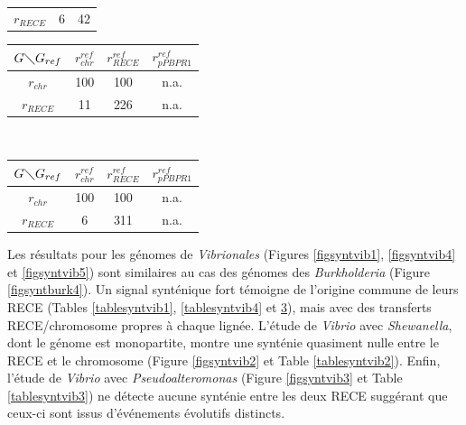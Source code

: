 \begin{table}[H]
\begin{center}
\begin{minipage}[t]{0.3\textwidth}
\begin{tabular}{c|cc}
   		$ r_{RECE}$ & 6 & 42\\
   	\end{tabular}
   \end{minipage}
   \begin{minipage}[t]{0.3\textwidth}
   \label{tablesyntvib4}
   	\begin{tabular}{c|ccc}
   		$G \diagdown G_{ref}$ & $r^{ref}_{chr}$ & $r^{ref}_{RECE}$ & $r^{ref}_{pPBPR1}$\\
   		\hline
    		$r_{chr}$ & 100 & 100 & n.a.\\
   		$r_{RECE}$ & 11 & 226 & n.a.\\
   		\end{tabular}
   \end{minipage}
   \\
 	\begin{minipage}[t]{0.4\textwidth}
   \label{tablesyntvib5}
   	\begin{tabular}{c|ccc}
   		$G \diagdown G_{ref}$ & $r^{ref}_{chr}$ & $r^{ref}_{RECE}$ & $r^{ref}_{pPBPR1}$\\
   		\hline
    		$r_{chr}$ & 100 & 100 & n.a.\\
   		$r_{RECE}$ & 6 & 311 & n.a.\\
   	\end{tabular}
	\end{minipage}  
   \end{center}
\end{table}     

  Les résultats pour les génomes de \textit{Vibrionales} (Figures \ref{figsyntvib1}, \ref{figsyntvib4} et \ref{figsyntvib5}) sont similaires au cas des génomes des \textit{Burkholderia} (Figure \ref{figsyntburk4}). Un signal synténique fort témoigne de l'origine commune de leurs RECE (Tables \ref{tablesyntvib1}, \ref{tablesyntvib4} et \ref{tablesyntvib5}), mais avec des transferts RECE/chromosome propres à chaque lignée. L'étude de \textit{Vibrio} avec \textit{Shewanella}, dont le génome est monopartite, montre une synténie quasiment nulle entre le RECE et le chromosome (Figure \ref{figsyntvib2} et Table \ref{tablesyntvib2}). Enfin, l'étude de \textit{Vibrio} avec \textit{Pseudoalteromonas} (Figure \ref{figsyntvib3} et Table \ref{tablesyntvib3}) ne détecte aucune synténie entre les deux RECE suggérant que ceux-ci sont issus d'événements évolutifs distincts.
  
